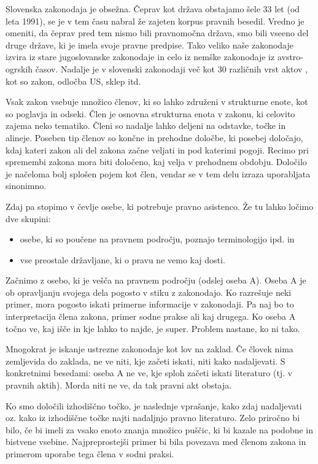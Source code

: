 \documentclass[a4paper,12pt,openright]{book}
\begin{document}
Slovenska zakonodaja je obsežna. Čeprav kot država obstajamo šele 33 let (od leta 1991), se je v tem času nabral že zajeten korpus pravnih besedil. Vredno je omeniti, da čeprav pred tem nismo bili pravnomočna država, smo bili vseeno del druge države, ki je imela svoje pravne predpise. Tako veliko naše zakonodaje izvira iz stare jugoslovanske zakonodaje in celo iz nemške zakonodaje iz avstro-ogrskih časov. Nadalje je v slovenski zakonodaji več kot 30 različnih vrst aktov \cite{pisrs_api_akti}, kot so zakon, odločba US, sklep itd.

Vsak zakon vsebuje množico členov, ki so lahko združeni v strukturne enote, kot so poglavja in odseki. Člen je osnovna strukturna enota v zakonu, ki celovito zajema neko tematiko. Členi so nadalje lahko deljeni na odstavke, točke in alineje. Poseben tip členov so končne in prehodne določbe, ki posebej določajo, kdaj kateri zakon ali del zakona začne veljati in pod katerimi pogoji. Recimo pri spremembi zakona mora biti določeno, kaj velja v prehodnem obdobju. Določilo je načeloma bolj splošen pojem kot člen, vendar se v tem delu izraza uporabljata sinonimno.

Zdaj pa stopimo v čevlje osebe, ki potrebuje pravno asistenco. Že tu lahko ločimo dve skupini:
\begin{itemize}
	\item osebe, ki so poučene na pravnem področju, poznajo terminologijo ipd. in
	\item vse preostale državljane, ki o pravu ne vemo kaj dosti.
\end{itemize}

Začnimo z osebo, ki je vešča na pravnem področju (odslej oseba A). Oseba A je ob opravljanju svojega dela pogosto v stiku z zakonodajo. Ko razrešuje neki primer, mora pogosto iskati primerne informacije v zakonodaji. Pa naj bo to interpretacija člena zakona, primer sodne prakse ali kaj drugega. Ko oseba A točno ve, kaj išče in kje lahko to najde, je super. Problem nastane, ko ni tako.

Mnogokrat je iskanje ustrezne zakonodaje kot lov na zaklad. Če človek nima zemljevida do zaklada, ne ve niti, kje začeti iskati, niti kako nadaljevati. S konkretnimi besedami: oseba A ne ve, kje sploh začeti iskati literaturo (tj. v pravnih aktih). Morda niti ne ve, da tak pravni akt obstaja.

Ko smo določili izhodiščno točko, je naslednje vprašanje, kako zdaj nadaljevati oz. kako iz izhodiščne točke najti nadaljnjo pravno literaturo. Zelo priročno bi bilo, če bi imeli za vsako enoto znanja množico puščic, ki bi kazale na podobne in bistvene vsebine. Najpreprostejši primer bi bila povezava med členom zakona in primerom uporabe tega člena v sodni praksi.
\end{document}
